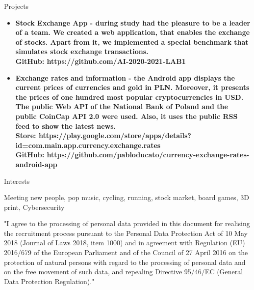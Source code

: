 \documentclass{resume}
\begin{document}
\begin{rSection}{Projects}

    \begin{itemize}
        \item \bf Stock Exchange App \normalfont - during study had the pleasure to be a leader of a team.
        We created a web application, that enables the exchange of stocks. Apart from it, we implemented a special benchmark that simulates stock exchange transactions.\\
        GitHub: https://github.com/AI-2020-2021-LAB1
        \item \bf Exchange rates and information \normalfont - the Android app displays the current prices of currencies and gold in PLN.
        Moreover, it presents the prices of one hundred most popular cryptocurrencies in USD.
        The public Web API of the National Bank of Poland and the public CoinCap API 2.0 were used.
        Also, it uses the public RSS feed to show the latest news.\\
        Store: https://play.google.com/store/apps/details?id=com.main.app.currency.exchange.rates \\
        GitHub: https://github.com/pabloducato/currency-exchange-rates-android-app
    \end{itemize}
    
\end{rSection}

\begin{rSection}{Interests}

{Meeting new people, pop music, cycling, running, stock market, board games, 3D print, Cybersecurity}

\end{rSection}

{\footnotesize "I agree to the processing of personal data provided in this document for realising the recruitment process pursuant to the Personal Data
Protection Act of 10 May 2018 (Journal of Laws 2018, item 1000) and in agreement with Regulation (EU) 2016/679 of the European Parliament and of
the Council of 27 April 2016 on the protection of natural persons with regard to the processing of personal data and on the free movement of such
data, and repealing Directive 95/46/EC (General Data Protection Regulation)."}
\end{document}
